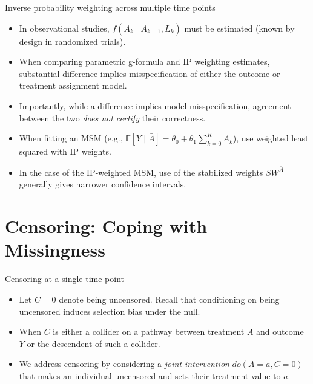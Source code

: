 \documentclass[ignorenonframetext,]{beamer}
\providecommand{\tightlist}{%
  \setlength{\itemsep}{0pt}\setlength{\parskip}{0pt}}
\newcommand{\E}{\mathbb{E}}
\begin{document}
\begin{frame}{Inverse probability weighting across multiple time points}
\protect\hypertarget{inverse-probability-weighting-across-multiple-time-points-2}{}

\begin{itemize}[<+->]
\tightlist
\item
  In observational studies, \(f(A_k \mid \bar{A}_{k-1}, \bar{L}_k)\)
  must be estimated (known by design in randomized trials).
\item
  When comparing parametric g-formula and IP weighting estimates,
  substantial difference implies misspecification of either the outcome
  or treatment assignment model.
\item
  Importantly, while a difference implies model misspecification,
  agreement between the two \emph{does not certify} their correctness.
\item
  When fitting an MSM (e.g.,
  \(\E[Y \mid \bar{A}] = \theta_0 + \theta_1 \sum_{k=0}^K A_k\)), use
  weighted least squared with IP weights.
\item
  In the case of the IP-weighted MSM, use of the stabilized weights
  \(SW^{\bar{A}}\) generally gives narrower confidence intervals.
\end{itemize}

\end{frame}

\hypertarget{censoring-coping-with-missingness}{%
\section{Censoring: Coping with
Missingness}\label{censoring-coping-with-missingness}}

\begin{frame}{Censoring at a single time point}
\protect\hypertarget{censoring-at-a-single-time-point}{}

\begin{itemize}[<+->]
\tightlist
\item
  Let \(C = 0\) denote being uncensored. Recall that conditioning on
  being uncensored induces selection bias under the null.
\item
  When \(C\) is either a collider on a pathway between treatment \(A\)
  and outcome \(Y\) or the descendent of such a collider.
\item
  We address censoring by considering a \emph{joint intervention}
  \(do(A = a, C = 0)\) that makes an individual uncensored and sets
  their treatment value to \(a\).
\end{itemize}

\end{frame}
\end{document}

